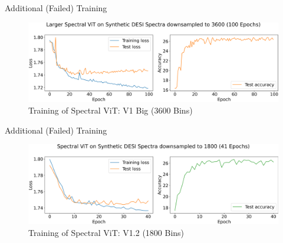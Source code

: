 

\begin{frame}{Additional (Failed) Training}
    \begin{figure}[t!]
        \centering
        \includegraphics[width=\linewidth]{figures/v1_real/vit_model_V1_bigtraining_new.png}
        \caption{Training of Spectral ViT: V1 Big (3600 Bins)}
        \label{fig:vit1_big_training}
    \end{figure}
\end{frame}

\begin{frame}{Additional (Failed) Training}
    \begin{figure}[hb!]
        \centering
        \includegraphics[width=\linewidth]{figures/vit_model_V1.2training_new.png}
        \caption{Training of Spectral ViT: V1.2 (1800 Bins)}
        \label{fig:vit1.2_training}
    \end{figure}
\end{frame}

